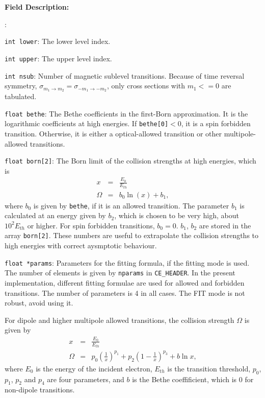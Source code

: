 \documentclass[twoside,letterpaper]{refrep}
\newenvironment{dbdesc}{\textbf{Field Description:} \begin{list}
	{:}{\setlength{\labelwidth}{2in}
	   \setlength{\leftmargin}{2in}
	   \setlength{\labelsep}{0.1in}
	   \setlength{\rightmargin}{0.2in}}}
	{\end{list}}
\begin{document}
\begin{dbdesc}
\item[\texttt{int lower}:] The lower level index.
\item[\texttt{int upper}:] The upper level index.
\item[\texttt{int nsub}:] Number of magnetic sublevel transitions. Because of
time reversal symmetry, $\sigma_{m_1\to m_2}=\sigma_{-m_1\to -m_2}$, only cross
sections with $m_1 <= 0$ are tabulated.
\item[\texttt{float bethe}:] The Bethe coefficients in the first-Born
approximation. It is the logarithmic coefficients at high energies. If
\texttt{bethe[0]}$<0$, it is a spin forbidden transition. Otherwise, it is
either a optical-allowed transition or other multipole-allowed transitions.
\item[\texttt{float born[2]}:] The Born limit of the collision strengths at
high energies, which is
\begin{eqnarray}
x &=& \frac{E_0}{E_{th}} \nonumber\\
\Omega &=& b_0\ln(x) + b_1,
\end{eqnarray}
where $b_0$ is given by \texttt{bethe}, if it is an allowed transition. The
parameter $b_1$ is calculated at an energy given by $b_2$, which is chosen to
be very high, about $10^{2}E_{th}$ or higher.
For spin forbidden transitions, $b_0 = 0$. $b_1$, $b_2$ are stored in the array
\texttt{born[2]}. These numbers are useful to extrapolate the collision
strengths to high energies with correct aysmptotic behaviour.
\item[\texttt{float *params}:] Parameters for the fitting formula, if the
fitting mode is used. The number of elements is given by \texttt{nparams} in
\texttt{CE\_HEADER}. In the present implementation, different fitting formulae
are used for allowed and forbidden transitions. The number of parameters is 4
in all cases. The FIT mode is not robust, avoid using it.

For dipole and higher multipole allowed transitions, the
collision strength $\Omega$ is given by
\begin{eqnarray}
x &=& \frac{E_0}{E_{th}} \nonumber\\
\Omega &=& p_0\left(\frac{1}{x}\right)^{p_1} + 
p_2\left(1-\frac{1}{x}\right)^{p_3} + b\ln x,
\end{eqnarray}
where $E_0$ is the energy of the incident electron, $E_{th}$ is the transition
threshold, $p_0$, $p_1$, $p_2$ and $p_4$ are four parameters, and $b$ is the
Bethe coeffificient, which is 0 for non-dipole transitions.


\end{dbdesc}
\end{document}
